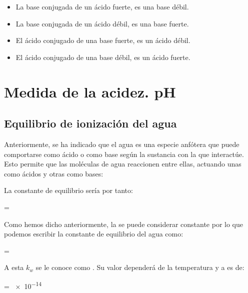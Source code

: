 \begin{itemize}
    \item La base conjugada de un ácido fuerte, es una base débil.
    \item La base conjugada de un ácido débil, es una base fuerte.
    \item El ácido conjugado de una base fuerte, es un ácido débil.
    \item El ácido conjugado de una base débil, es un ácido fuerte.
\end{itemize}


\section{Medida de la acidez. pH}\label{sec:medida-de-la-acidez.-ph}

\subsection{Equilibrio de ionización del agua}\label{subsec:equilibrio-de-ionizacion-del-agua}

Anteriormente, se ha indicado que el agua es una especie anfótera que puede comportarse como ácido o como base según la sustancia con la que interactúe.
Esto permite que las moléculas de agua reaccionen entre ellas, actuando unas como ácidos y otras como bases:
\begin{centeredequation}
\end{centeredequation}

La constante de equilibrio sería por tanto:
\begin{centeredequation}
    \Kw = \label{eq:cte-agua-inicio}
\end{centeredequation}

Como hemos dicho anteriormente, la  se puede considerar constante por lo que podemos escribir la constante de equilibrio del agua \Kw{} como:
\begin{centeredequation}
    \Kw = \ \label{eq:cte-agua}
\end{centeredequation}


A esta \(k_w\) se le conoce como .
Su valor dependerá de la temperatura y a  es de:
\begin{centeredequation}
    \Kw = \num{e-14}
    \label{eq:valor-de-k-agua}
\end{centeredequation}


